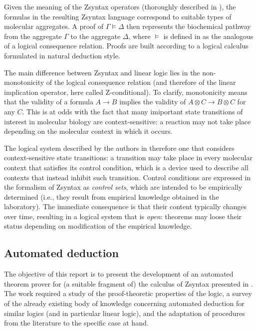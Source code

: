Given the meaning of the Zsyntax operators (thoroughly described in
\cite{adding-logic}), the formulas in the resulting Zsyntax language correspond
to suitable types of molecular aggregates. A proof of $\Gamma \models \Delta$
then represents the biochemical pathway from the aggregate $\Gamma$ to the
aggregate $\Delta$, where $\models$ is defined in \cite{adding-logic} as the
analogous of a logical consequence relation. Proofs are built according to a
logical calculus formulated in natural deduction style.

The main difference between Zsyntax and linear logic lies in the
non-monotonicity of the logical consequence relation (and therefore of the
linear implication operator, here called Z-conditional). To clarify,
monotonicity means that the validity of a formula $A \rightarrow B$ implies the
validity of $A \otimes C \rightarrow B \otimes C$ for any $C$. This is at odds
with the fact that many imiportant state transitions of interest in molecular
biology are context-sensitive: a reaction may not take place depending on the
molecular context in which it occurs.

The logical system described by the authors in therefore one that considers
context-sensitive state transitions: a transition may take place in every
molecular context that satisfies its control condition, which is a device used
to describe all contexts that instead inhibit such transition.
Control conditions are expressed in the formalism of Zsyntax as
\emph{control sets}, which are intended to be empirically determined (i.e., they
result from empirical knowledge obtained in the laboratory). The immediate
consequence is that their content typically changes over time, resulting in a
logical system that is \emph{open}: theorems may loose their status depending on
modification of the empirical knowledge.

\subsection{Automated deduction}

The objective of this report is to present the development of an automated
theorem prover for (a suitable fragment of) the calculus of Zsyntax presented in
\cite{adding-logic}. The work required a study of the proof-theoretic properties
of the logic, a survey of the already existing body of knowledge concerning
automated deduction for similar logics (and in particular linear logic), and the
adaptation of procedures from the literature to the specific case at hand.

